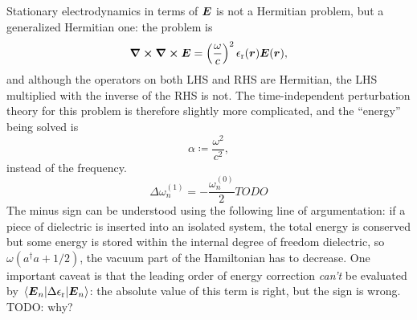 \documentclass[hyperref, a4paper]{article}
\newcommand{\epsr}{\epsilon_{\text{r}}}
\begin{document}
Stationary electrodynamics in terms of $\vb*{E}$ is not a Hermitian problem, 
but a generalized Hermitian one:
the problem is 
\begin{equation}
    \curl{\curl{\vb*{E}}} = \left(\frac{\omega}{c}\right)^2 \epsr(\vb*{r}) \vb*{E}(\vb*{r}),
\end{equation}
and although the operators on both LHS and RHS are Hermitian, 
the LHS multiplied with the inverse of the RHS is not.
The time-independent perturbation theory for this problem is therefore slightly more complicated, 
and the ``energy'' being solved is 
\begin{equation}
    \alpha \coloneqq \frac{\omega^2}{c^2},
\end{equation}
instead of the frequency. 
\begin{equation}
    \Delta \omega^{(1)}_n = - \frac{\omega_n^{(0)}}{2} TODO
\end{equation}
The minus sign can be understood using the following line of argumentation:
if a piece of dielectric is inserted into an isolated system, 
the total energy is conserved but some energy is stored 
within the internal degree of freedom dielectric, 
so $\omega (a^\dagger a + 1/2)$, the vacuum part of the Hamiltonian has to decrease.
One important caveat is that the leading order of energy correction 
\emph{can't} be evaluated by $\mel*{\vb*{E}_n}{\Delta \epsr}{\vb*{E}_n}$:
the absolute value of this term is right, 
but the sign is wrong. TODO: why?
\end{document}
